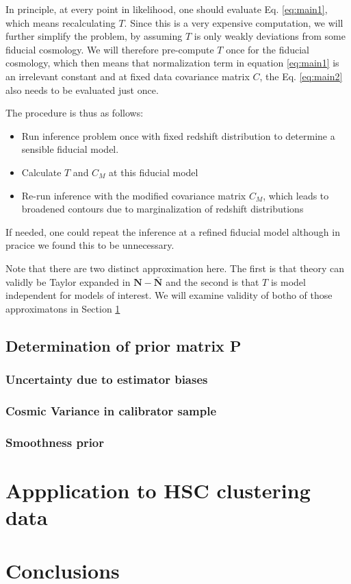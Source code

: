 \documentclass[a4paper,11pt]{article}
\newcommand{\vN}{\mathbf{N}}
\begin{document}
  In principle, at every point in likelihood, one should evaluate Eq. \ref{eq:main1}, which means recalculating $T$. Since this is a very expensive computation, we will further simplify the problem, by assuming $T$ is only weakly deviations from some fiducial cosmology. We will therefore pre-compute $T$ once for the fiducial cosmology, which then means that normalization term in equation \ref{eq:main1} is an irrelevant constant and at fixed data covariance matrix $C$, the Eq. \ref{eq:main2} also needs to be evaluated just once.

  The procedure is thus as follows:
  \begin{itemize}
  \item Run inference problem once with fixed redshift distribution to determine a sensible fiducial model.
    
  \item Calculate $T$ and $C_M$ at this fiducial model
    
  \item Re-run inference with the modified covariance matrix $C_M$, which leads to broadened contours due to marginalization of redshift distributions
    
  \end{itemize}
If needed, one could repeat the inference at a refined fiducial model although in pracice we found this to be unnecessary.

Note that there are two distinct approximation here. The first is that theory can validly be Taylor expanded in $\vN-\bar{\vN}$ and the second is that $T$ is model independent for models of interest. We will examine validity of botho of those approximatons in Section \ref{sec:hsc}

\subsection{Determination of prior matrix P}

\subsubsection{Uncertainty due to estimator biases}

\subsubsection{Cosmic Variance in calibrator sample}

\subsubsection{Smoothness prior}


  





\section{Appplication to HSC clustering data}
\label{sec:hsc}



\section{Conclusions}



\end{document}
